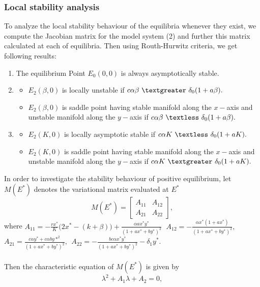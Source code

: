 \documentclass[a4paper, 10pt]{article}
\begin{document}
	\subsubsection{Local stability analysis}
	To analyze the local stability behaviour of the equilibria whenever they exist, we compute the Jacobian matrix for the model system (2) and further this matrix calculated at each of equilibria. Then using Routh-Hurwitz criteria, we get following results:
	\begin{enumerate}
		\item The equilibrium Point $E_0(0,0)$ is always asymptotically stable.
		\item \begin{itemize}
			\item $E_2(\beta,0)$ is locally unstable if $c\alpha \beta~\textgreater ~\delta_0(1+a\beta).$
			\item $E_2(\beta,0)$ is saddle point having stable manifold along the $x-$axis and unstable manifold along the $y-$axis if $c\alpha \beta ~\textless~\delta_0(1+a\beta).$
		\end{itemize}
		\item \begin{itemize}
			\item $E_2(K,0)$ is locally asymptotic stable if $c\alpha K~\textless~\delta_0(1+aK).$
			\item $E_2(K,0)$ is saddle point having stable manifold along the $x-$axis and unstable manifold along the $y-$axis if $c\alpha K~\textgreater~\delta_0(1+aK).$
		\end{itemize}
	\end{enumerate}
	In order to investigate the stability behaviour of positive equilibrium, let $M(E^*)$ denotes the variational matrix evaluated at $E^*$ 
	\[M(E^*)=\begin{bmatrix}
	A_{11}&A_{12}\\A_{21}&A_{22}
	\end{bmatrix},\]
	where $A_{11}=-\frac{rx^*}{K}\Big(2x^*-(k+\beta)\Big)+\frac{\alpha ax^*y^* }{(1+ax^*+by^*)^2} \,~~A_{12}=-\frac{\alpha x^*(1+ax^*)}{(1+ax^*+by^*)^2},$\\
	$A_{21}=\frac{c\alpha y^*+c\alpha by*^2}{(1+ax^*+by^*)^2},~~A_{22}=-\frac{bc\alpha x^*y^*}{(1+ax^*+by^*)^2}-\delta_1 y^*.$\\ \\
	Then the characteristic equation of $M(E^*)$ is given by
	\begin{equation}
	\lambda^2+A_1\lambda+A_2=0,
	\end{equation}
\end{document}

